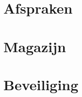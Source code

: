 \documentclass{report}
\begin{document}



\chapter{Afspraken}\label{cha:afspraken} %





\chapter{Magazijn}\label{cha:magazijn} %




\chapter{Beveiliging}\label{cha:beveiliging} %




\end{document}
